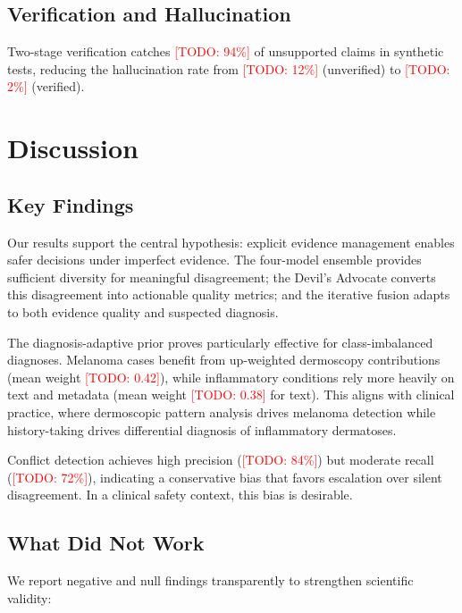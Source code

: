 \documentclass[conference]{IEEEtran}
\newcommand{\todo}[1]{\textcolor{red}{[TODO: #1]}}
\begin{document}
\subsection{Verification and Hallucination}

Two-stage verification catches \todo{94\%} of unsupported claims in synthetic tests, reducing the hallucination rate from \todo{12\%} (unverified) to \todo{2\%} (verified).

\section{Discussion}
\label{sec:discussion}

\subsection{Key Findings}

Our results support the central hypothesis: explicit evidence management enables safer decisions under imperfect evidence. The four-model ensemble provides sufficient diversity for meaningful disagreement; the Devil's Advocate converts this disagreement into actionable quality metrics; and the iterative fusion adapts to both evidence quality and suspected diagnosis.

The diagnosis-adaptive prior proves particularly effective for class-imbalanced diagnoses. Melanoma cases benefit from up-weighted dermoscopy contributions (mean weight \todo{0.42}), while inflammatory conditions rely more heavily on text and metadata (mean weight \todo{0.38} for text). This aligns with clinical practice, where dermoscopic pattern analysis drives melanoma detection while history-taking drives differential diagnosis of inflammatory dermatoses.

Conflict detection achieves high precision (\todo{84\%}) but moderate recall (\todo{72\%}), indicating a conservative bias that favors escalation over silent disagreement. In a clinical safety context, this bias is desirable.

\subsection{What Did Not Work}

We report negative and null findings transparently to strengthen scientific validity:
\end{document}
